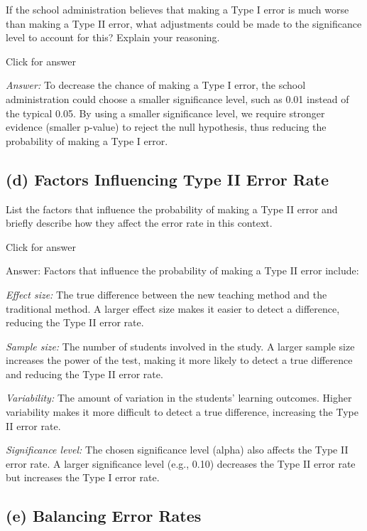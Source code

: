 \documentclass[
]{book}
\begin{document}
If the school administration believes that making a Type I error is much worse than making a Type II error, what adjustments could be made to the significance level to account for this? Explain your reasoning.

Click for answer

\emph{Answer:} To decrease the chance of making a Type I error, the school administration could choose a smaller significance level, such as 0.01 instead of the typical 0.05. By using a smaller significance level, we require stronger evidence (smaller p-value) to reject the null hypothesis, thus reducing the probability of making a Type I error.

\hypertarget{d-factors-influencing-type-ii-error-rate}{%
\subsection{(d) Factors Influencing Type II Error Rate}\label{d-factors-influencing-type-ii-error-rate}}

List the factors that influence the probability of making a Type II error and briefly describe how they affect the error rate in this context.

Click for answer

Answer: Factors that influence the probability of making a Type II error include:

\emph{Effect size:} The true difference between the new teaching method and the traditional method. A larger effect size makes it easier to detect a difference, reducing the Type II error rate.

\emph{Sample size:} The number of students involved in the study. A larger sample size increases the power of the test, making it more likely to detect a true difference and reducing the Type II error rate.

\emph{Variability:} The amount of variation in the students' learning outcomes. Higher variability makes it more difficult to detect a true difference, increasing the Type II error rate.

\emph{Significance level:} The chosen significance level (alpha) also affects the Type II error rate. A larger significance level (e.g., 0.10) decreases the Type II error rate but increases the Type I error rate.

\hypertarget{e-balancing-error-rates}{%
\subsection{(e) Balancing Error Rates}\label{e-balancing-error-rates}}
\end{document}
